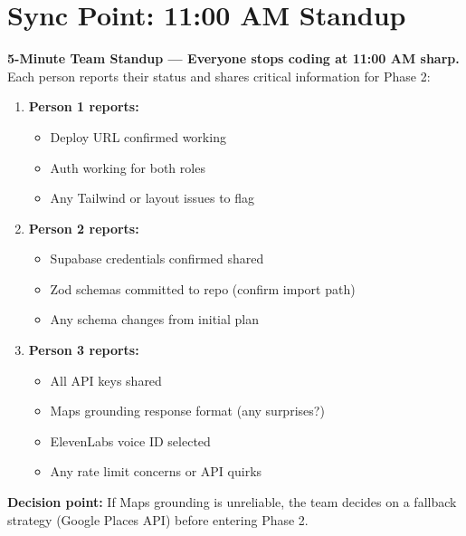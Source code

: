 \documentclass[11pt, a4paper]{article}
\begin{document}
\newpage

\section{Sync Point: 11:00 AM Standup}

\begin{syncbox}
{\large\textbf{5-Minute Team Standup --- Everyone stops coding at 11:00 AM sharp.}}\\[8pt]
Each person reports their status and shares critical information for Phase 2:

\begin{enumerate}[leftmargin=2em, itemsep=4pt]
  \item \textbf{Person 1 reports:}
    \begin{itemize}[itemsep=1pt]
      \item Deploy URL confirmed working
      \item Auth working for both roles
      \item Any Tailwind or layout issues to flag
    \end{itemize}
  \item \textbf{Person 2 reports:}
    \begin{itemize}[itemsep=1pt]
      \item Supabase credentials confirmed shared
      \item Zod schemas committed to repo (confirm import path)
      \item Any schema changes from initial plan
    \end{itemize}
  \item \textbf{Person 3 reports:}
    \begin{itemize}[itemsep=1pt]
      \item All API keys shared
      \item Maps grounding response format (any surprises?)
      \item ElevenLabs voice ID selected
      \item Any rate limit concerns or API quirks
    \end{itemize}
\end{enumerate}

\textbf{Decision point:} If Maps grounding is unreliable, the team decides on a fallback strategy (Google Places API) before entering Phase 2.
\end{syncbox}
\end{document}
